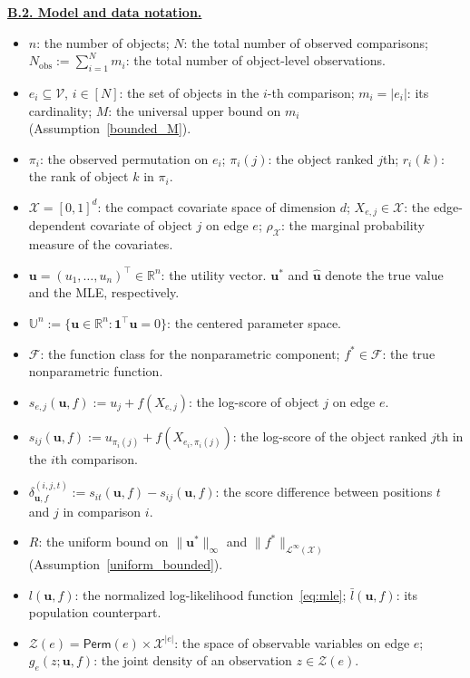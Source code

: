 \documentclass[
  12pt]{article}
\begin{document}
\underline{\textbf{B.2. Model and data notation.}}
\begin{itemize}
    \item $n$: the number of objects; $N$: the total number of observed comparisons; $N_{\mathrm{obs}} := \sum_{i=1}^N m_i$: the total number of object-level observations.
    \item $e_i \subseteq \mathcal{V}$, $i \in [N]$: the set of objects in the $i$-th comparison; $m_i = |e_i|$: its cardinality; $M$: the universal upper bound on $m_i$ (Assumption~\ref{bounded_M}).
    \item $\pi_i$: the observed permutation on $e_i$; $\pi_i(j)$: the object ranked $j$th; $r_i(k)$: the rank of object $k$ in $\pi_i$.
    \item $\mathcal{X} = [0,1]^d$: the compact covariate space of dimension $d$; $X_{e,j} \in \mathcal{X}$: the edge-dependent covariate of object $j$ on edge $e$; $\rho_{\mathcal{X}}$: the marginal probability measure of the covariates.
    \item $\boldsymbol{u} = (u_1, \ldots, u_n)^\top \in \mathbb{R}^n$: the utility vector. $\boldsymbol{u}^*$ and $\widehat{\boldsymbol{u}}$ denote the true value and the MLE, respectively.
    \item $\mathbb{U}^n := \{\boldsymbol{u} \in \mathbb{R}^n : \mathbf{1}^\top \boldsymbol{u} = 0\}$: the centered parameter space.
    \item $\mathcal{F}$: the function class for the nonparametric component; $f^* \in \mathcal{F}$: the true nonparametric function.
    \item $s_{e,j}(\boldsymbol{u}, f) := u_j + f(X_{e,j})$: the log-score of object $j$ on edge $e$.
    \item $s_{ij}(\boldsymbol{u}, f) := u_{\pi_i(j)} + f(X_{e_i, \pi_i(j)})$: the log-score of the object ranked $j$th in the $i$th comparison.
    \item $\delta_{\boldsymbol{u},f}^{(i,j,t)} := s_{it}(\boldsymbol{u},f) - s_{ij}(\boldsymbol{u},f)$: the score difference between positions $t$ and $j$ in comparison $i$.
    \item $R$: the uniform bound on $\|\boldsymbol{u}^*\|_\infty$ and $\|f^*\|_{\mathcal{L}^\infty(\mathcal{X})}$ (Assumption~\ref{uniform_bounded}).
    \item $l(\boldsymbol{u}, f)$: the normalized log-likelihood function~\eqref{eq:mle}; $\bar{l}(\boldsymbol{u}, f)$: its population counterpart.
    \item $\mathcal{Z}(e) = \mathsf{Perm}(e) \times \mathcal{X}^{|e|}$: the space of observable variables on edge $e$; $g_e(z; \boldsymbol{u}, f)$: the joint density of an observation $z \in \mathcal{Z}(e)$.

\end{itemize}
\end{document}
